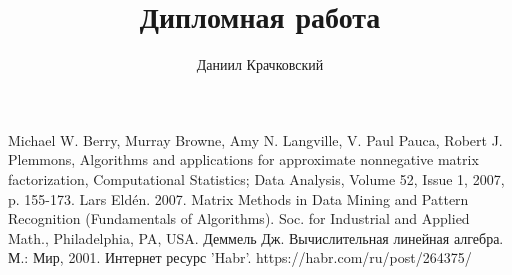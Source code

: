 \documentclass[14pt]{extarticle}
\author{Даниил Крачковский}
\title{Дипломная работа}
\begin{document}
	

	\tableofcontents{}

	
	
	
	
	

	\begin{thebibliography}{9}
		 Michael W. Berry, Murray Browne, Amy N. Langville, V. Paul Pauca, Robert J. Plemmons, Algorithms and applications for approximate nonnegative matrix factorization, Computational Statistics; Data Analysis, Volume 52, Issue 1, 2007, p. 155-173.
		 Lars Eldén. 2007. Matrix Methods in Data Mining and Pattern Recognition (Fundamentals of Algorithms). Soc. for Industrial and Applied Math., Philadelphia, PA, USA.
		 Деммель Дж. Вычислительная линейная алгебра. М.: Мир, 2001.
		 Интернет ресурс 'Habr'. https://habr.com/ru/post/264375/
	\end{thebibliography}
\end{document}
